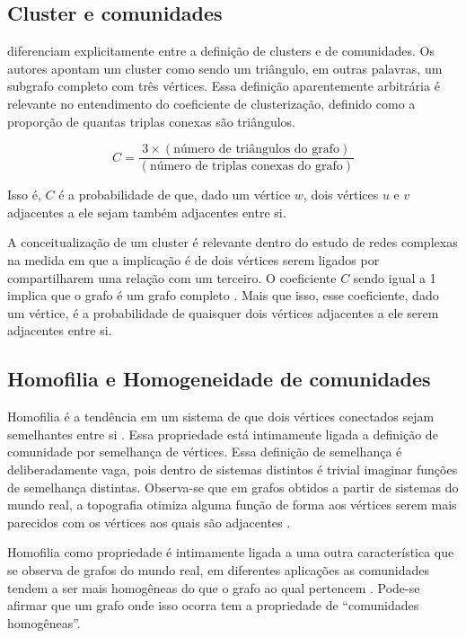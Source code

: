 \documentclass[notes.tex]{subfiles}
\begin{document}
\subsection{Cluster e comunidades}

 diferenciam explicitamente entre a definição de clusters e de comunidades.
Os autores apontam um cluster como sendo um triângulo, em outras palavras, um subgrafo completo com três vértices.
Essa definição aparentemente arbitrária é relevante no entendimento do coeficiente de clusterização, definido como a proporção de quantas triplas conexas são triângulos.


\begin{equation}\label{eq:coef_clus}
    C = \frac{3 \times (\text{número de triângulos do grafo})}{(\text{número de triplas conexas do grafo})}
\end{equation}

Isso é, $C$ é a probabilidade de que, dado um vértice $w$, dois vértices $u$ e $v$ adjacentes a ele sejam também adjacentes entre si.

A conceitualização de um cluster é relevante dentro do estudo de redes complexas na medida em que a implicação é de dois vértices serem ligados por compartilharem uma relação com um terceiro.
O coeficiente $C$ sendo igual a 1 implica que o grafo é um grafo completo \cite{girvan2002community}.
Mais que isso, esse coeficiente, dado um vértice, é a probabilidade de quaisquer dois vértices adjacentes a ele serem adjacentes entre si.

\subsection{Homofilia e Homogeneidade de comunidades}

Homofilia é a tendência em um sistema de que dois vértices conectados sejam semelhantes entre si \cite{akoglu2009rtg}.
Essa propriedade está intimamente ligada a definição de comunidade por semelhança de vértices.
Essa definição de semelhança é deliberadamente vaga, pois dentro de sistemas distintos é trivial imaginar funções de semelhança distintas.
Observa-se que em grafos obtidos a partir de sistemas do mundo real, a topografia otimiza alguma função de forma aos vértices serem mais parecidos com os vértices aos quais são adjacentes \cite{largeron2015generating}.

Homofilia como propriedade é intimamente ligada a uma outra característica que se observa de grafos do mundo real, em diferentes aplicações as comunidades tendem a ser mais homogêneas do que o grafo ao qual pertencem \cite{largeron2015generating}.
Pode-se afirmar que um grafo onde isso ocorra tem a propriedade de ``comunidades homogêneas''.
\end{document}
